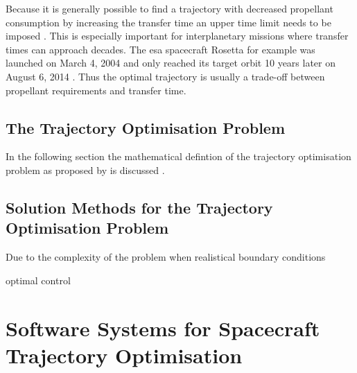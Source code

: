 Because it is generally possible to find a trajectory with decreased propellant consumption by increasing the transfer time an upper time limit needs to be imposed \autocite[p. 1]{conway_problem_2014}.
This is especially important for interplanetary missions where transfer times can approach decades.
The \ac{esa} spacecraft Rosetta for example was launched on March 4, 2004 and only reached its target orbit 10 years later on August 6, 2014 \autocite{glassmeier_rosetta_2007}.
Thus the optimal trajectory is usually a trade-off between propellant requirements and transfer time.

\subsection{The Trajectory Optimisation Problem}
\label{sec:trajectory-optimisation-problem}

In the following section the mathematical defintion of the trajectory optimisation problem as proposed by \citeauthor{betts_survey_1998} is discussed \autocite[pp. 1-2]{betts_survey_1998}.

\subsection{Solution Methods for the Trajectory Optimisation Problem}
\label{sec:solution-methods-trajectory-optimisation-problem}

Due to the complexity of the problem when realistical boundary conditions

optimal control

\section{Software Systems for Spacecraft Trajectory Optimisation}
\label{sec:software-systems-for-spacecraft-trajectory-optimisation}

\autocite{conway_elements_2014}

